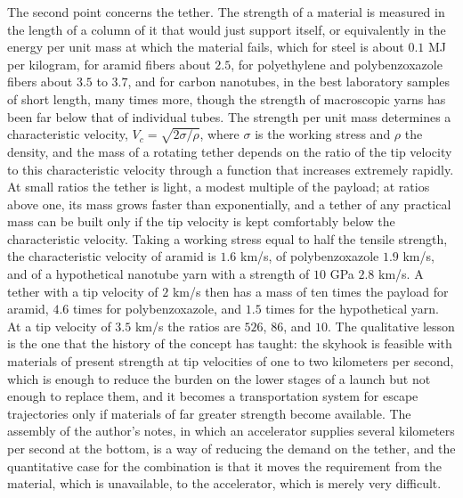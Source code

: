 The second point concerns the tether. The strength of a material is measured in the length of a column of it that would just support itself, or equivalently in the energy per unit mass at which the material fails, which for steel is about $0.1$ MJ per kilogram, for aramid fibers about $2.5$, for polyethylene and polybenzoxazole fibers about $3.5$ to $3.7$, and for carbon nanotubes, in the best laboratory samples of short length, many times more, though the strength of macroscopic yarns has been far below that of individual tubes. The strength per unit mass determines a characteristic velocity, $V_c=\sqrt{2\sigma/\rho}$, where $\sigma$ is the working stress and $\rho$ the density, and the mass of a rotating tether depends on the ratio of the tip velocity to this characteristic velocity through a function that increases extremely rapidly. At small ratios the tether is light, a modest multiple of the payload; at ratios above one, its mass grows faster than exponentially, and a tether of any practical mass can be built only if the tip velocity is kept comfortably below the characteristic velocity. Taking a working stress equal to half the tensile strength, the characteristic velocity of aramid is $1.6$ km/s, of polybenzoxazole $1.9$ km/s, and of a hypothetical nanotube yarn with a strength of $10$ GPa $2.8$ km/s. A tether with a tip velocity of $2$ km/s then has a mass of ten times the payload for aramid, $4.6$ times for polybenzoxazole, and $1.5$ times for the hypothetical yarn. At a tip velocity of $3.5$ km/s the ratios are $526$, $86$, and $10$. The qualitative lesson is the one that the history of the concept has taught: the skyhook is feasible with materials of present strength at tip velocities of one to two kilometers per second, which is enough to reduce the burden on the lower stages of a launch but not enough to replace them, and it becomes a transportation system for escape trajectories only if materials of far greater strength become available. The assembly of the author's notes, in which an accelerator supplies several kilometers per second at the bottom, is a way of reducing the demand on the tether, and the quantitative case for the combination is that it moves the requirement from the material, which is unavailable, to the accelerator, which is merely very difficult.

